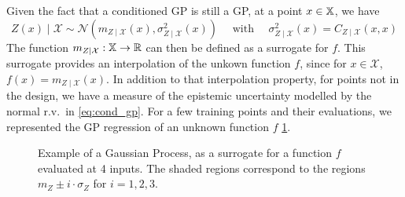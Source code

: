 \documentclass[../../Main_ManuscritThese.tex]{subfiles}
\newcommand\imgpath{/home/victor/acadwriting/Manuscrit/Text/Chapter4/img/}
\begin{document}


Given the fact that a conditioned GP is still a GP, at a point $x \in \mathbb{X}$, we have
\begin{equation}
  \label{eq:cond_gp}
  Z(x) \mid \mathcal{X} \sim \mathcal{N}\left(m_{Z\mid \mathcal{X}}(x), \sigma^2_{Z\mid \mathcal{X}}(x)\right) \quad \text{ with } \quad \sigma^2_{Z\mid \mathcal{X}}(x) = C_{Z \mid \mathcal{X}}(x, x)
\end{equation}
The function $m_{Z \mid \mathcal{X}}: \mathbb{X} \rightarrow \mathbb{R}$ can then be defined as a surrogate for $f$. This surrogate provides an interpolation of the unkown function $f$, since for $x \in \mathcal{X}$, $f(x) = m_{Z \mid \mathcal{X}}(x)$.
In addition to that interpolation property, for points not in the design, we have a measure of the epistemic uncertainty modelled by the normal r.v.\ in \eqref{eq:cond_gp}.
For a few training points and their evaluations, we represented the GP regression of an unknown function $f$ \cref{fig:example_GP}.

\begin{figure}[ht]
  \centering
  
  \caption{\label{fig:example_GP} Example of a Gaussian Process, as a surrogate for a function $f$ evaluated at 4 inputs. The shaded regions correspond to the regions $m_Z \pm i \cdot \sigma_Z$ for $i=1, 2,3$.}
\end{figure}
\end{document}
